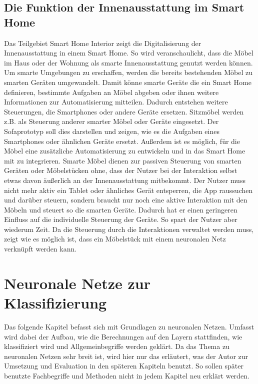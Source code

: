 \subsection{Die Funktion der Innenausstattung im Smart Home}
Das Teilgebiet Smart Home Interior zeigt die Digitalisierung der Innenausstattung in einem Smart Home. So wird veranschaulicht, dass die Möbel im Haus oder der Wohnung als smarte Innenausstattung genutzt werden können. Um smarte Umgebungen zu erschaffen, werden die bereits bestehenden Möbel zu smarten Geräten umgewandelt. Damit könne smarte Geräte die ein Smart Home definieren, bestimmte Aufgaben an Möbel abgeben oder ihnen weitere Informationen zur Automatisierung mitteilen. Dadurch entstehen weitere Steuerungen, die Smartphones oder andere Geräte ersetzen. 
\newline
Sitzmöbel werden z.B. als Steuerung anderer smarter Möbel oder Geräte eingesetzt. Der Sofaprototyp soll dies darstellen und zeigen, wie es die Aufgaben eines Smartphones oder ähnlichen Geräte ersetzt. Außerdem ist es möglich, für die Möbel eine zusätzliche Automatisierung zu entwickeln und in das Smart Home mit zu integrieren. Smarte Möbel dienen zur passiven Steuerung von smarten Geräten oder Möbelstücken ohne, dass der Nutzer bei der Interaktion selbst etwas davon äußerlich an der Innenausstattung mitbekommt. Der Nutzer muss nicht mehr aktiv ein Tablet oder ähnliches Gerät entsperren, die App raussuchen und darüber steuern, sondern braucht nur noch eine aktive Interaktion mit den Möbeln und steuert so die smarten Geräte. Dadurch hat er einen geringeren Einfluss auf die individuelle Steuerung der Geräte. So spart der Nutzer aber wiederum Zeit. Da die Steuerung durch die Interaktionen verwaltet werden muss, zeigt \citep{soares2010embedding} wie es möglich ist, dass ein Möbelstück mit einem neuronalen Netz verknüpft werden kann.

\section{Neuronale Netze zur Klassifizierung}
\label{sec:NNK}
Das folgende Kapitel befasst sich mit Grundlagen zu neuronalen Netzen. Umfasst wird dabei der Aufbau, wie die Berechnungen auf den Layern stattfinden, wie klassifiziert wird und Allgemeinbegriffe werden geklärt. Da das Thema zu neuronalen Netzen sehr breit ist, wird hier nur das erläutert, was der Autor zur Umsetzung und Evaluation in den späteren Kapiteln benutzt. So sollen später benutzte Fachbegriffe und Methoden nicht in jedem Kapitel neu erklärt werden.

